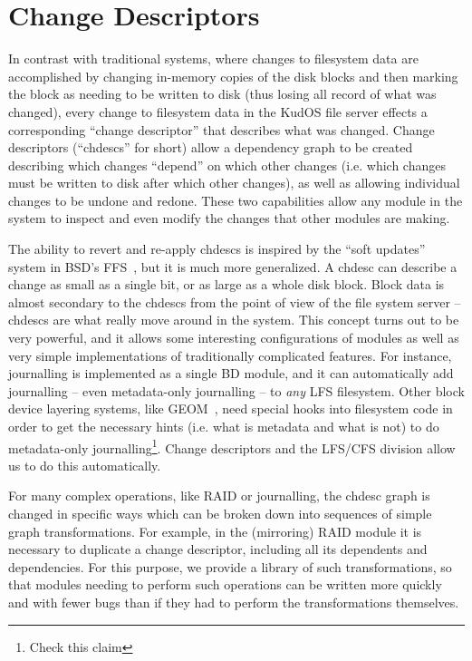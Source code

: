\section{Change Descriptors}
\label{sec:chdescs}

In contrast with traditional systems, where changes to filesystem data are
accomplished by changing in-memory copies of the disk blocks and then marking
the block as needing to be written to disk (thus losing all record of what was
changed), every change to filesystem data in the KudOS file server effects a
corresponding ``change descriptor'' that describes what was changed. Change
descriptors (``chdescs'' for short) allow a dependency graph to be created
describing which changes ``depend'' on which other changes (i.e. which changes
must be written to disk after which other changes), as well as allowing
individual changes to be undone and redone. These two capabilities allow any
module in the system to inspect and even modify the changes that other modules
are making.

The ability to revert and re-apply chdescs is inspired by the ``soft updates''
system in BSD's FFS~\cite{ganger00soft}, but it is much more generalized. A
chdesc can describe a change as small as a single bit, or as large as a whole
disk block. Block data is almost secondary to the chdescs from the point of view
of the file system server -- chdescs are what really move around in the system.
This concept turns out to be very powerful, and it allows some interesting
configurations of modules as well as very simple implementations of
traditionally complicated features. For instance, journalling is implemented as
a single BD module, and it can automatically add journalling -- even
metadata-only journalling -- to {\it any} LFS filesystem. Other block device
layering systems, like GEOM~\cite{geom}, need special hooks into filesystem code
in order to get the necessary hints (i.e. what is metadata and what is not) to
do metadata-only journalling\footnote{Check this claim}. Change descriptors and the LFS/CFS division allow
us to do this automatically.

For many complex operations, like RAID or journalling, the chdesc graph is
changed in specific ways which can be broken down into sequences of simple graph
transformations. For example, in the (mirroring) RAID module it is necessary to
duplicate a change descriptor, including all its dependents and dependencies.
For this purpose, we provide a library of such transformations, so that modules
needing to perform such operations can be written more quickly and with fewer
bugs than if they had to perform the transformations themselves.
